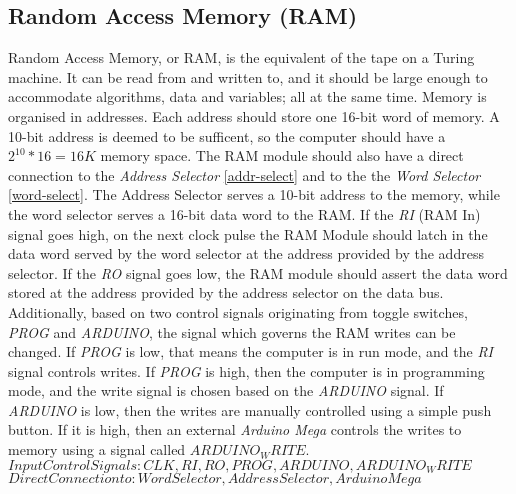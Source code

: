 \subsection{Random Access Memory (RAM)} \label{ram}
Random Access Memory, or RAM, is the equivalent of the tape on a Turing machine. It can be read from and written to, and it should
be large enough to accommodate algorithms, data and variables; all at the same time. Memory is organised in addresses. Each address
should store one 16-bit word of memory. A 10-bit address is deemed to be sufficent, so the computer should have a
\(2^10*16 = 16K\) memory space. The RAM module should also have a direct connection to the \emph{Address Selector}
\ref{addr-select} and to the the \emph{Word Selector} \ref{word-select}. The Address Selector serves a 10-bit address to the
memory, while the word selector serves a 16-bit data word to the RAM. If the \emph{RI} (RAM In) signal goes high, on the next clock
pulse the RAM Module should latch in the data word served by the word selector at the address provided by the address
selector. If the \emph{RO} signal goes low, the RAM module should assert the data word stored at the address provided by the
address selector on the data bus. Additionally, based on two control signals originating from toggle switches, \emph{PROG} and
\emph{ARDUINO}, the signal which governs the RAM writes can be changed. If \emph{PROG} is low, that means the computer is in run
mode, and the \emph{RI} signal controls writes. If \emph{PROG} is high, then the computer is in programming mode, and the
write signal is chosen based on the \emph{ARDUINO} signal. If \emph{ARDUINO} is low, then the writes are manually controlled
using a simple push button. If it is high, then an external \emph{Arduino Mega} \cite{arduino2020mega} controls the writes to
memory using a signal called \emph{$ARDUINO_WRITE$}. \\
\textbf{$Input Control Signals: CLK, RI, RO, PROG, ARDUINO, ARDUINO_WRITE$} \\
\textbf{$Direct Connection to: Word Selector, Address Selector, Arduino Mega$}

